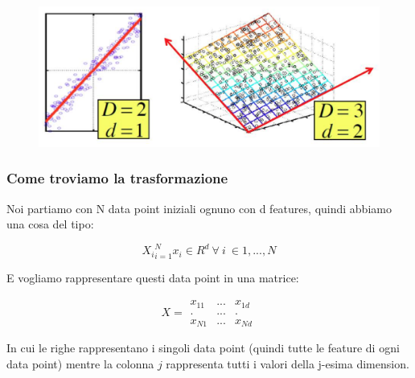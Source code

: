 \documentclass[14pt]{extreport}
\begin{document}
\begin{figure}[H]
	\centering
	\includegraphics[width=0.7\linewidth]{442.jpeg}
\end{figure}

\subsubsection{Come troviamo la trasformazione}

Noi partiamo con N data point iniziali ognuno con d features, quindi abbiamo una cosa del tipo:

$${X_i}_{i=1}^N x_i \in R^d \ \forall \ i \ \in {1,...,N}$$

E vogliamo rappresentare questi data point in una matrice:

\begin{equation}
	X = \begin{matrix}
		x_{11} & ... & x_{1d} \\
		.      & ... & .      \\
		x_{N1} & ... & x_{Nd}
	\end{matrix}
\end{equation}

In cui le righe rappresentano i singoli data point (quindi tutte le feature di ogni data point) mentre la colonna $j$ rappresenta tutti i valori della
j-esima dimension.
\end{document}
